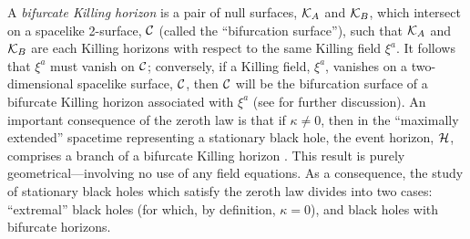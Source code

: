 \documentclass[12pt]{article}
\begin{document}
A {\em bifurcate Killing horizon} is a pair of null surfaces, ${\cal
K}_A$ and ${\cal K}_B$, which intersect on a spacelike 2-surface,
$\cal C$ (called the ``bifurcation surface''), such that ${\cal K}_A$
and ${\cal K}_B$ are each Killing horizons with respect to the same
Killing field $\xi^a$. It follows that $\xi^a$ must vanish on $\cal
C$; conversely, if a Killing field, $\xi^a$, vanishes on a
two-dimensional spacelike surface, ${\cal C}$, then ${\cal C}$ will be
the bifurcation surface of a bifurcate Killing horizon associated with
$\xi^a$ (see \cite{w4} for further discussion). An important
consequence of the zeroth law is that if $\kappa \neq 0$, then in the
``maximally extended'' spacetime representing a stationary black hole,
the event horizon, ${\cal H}$, comprises a branch of a bifurcate
Killing horizon \cite{rw2}. This result is purely
geometrical---involving no use of any field equations. As a
consequence, the study of stationary black holes which satisfy the
zeroth law divides into two cases: ``extremal'' black holes (for
which, by definition, $\kappa = 0$), and black holes with bifurcate
horizons.
\end{document}
